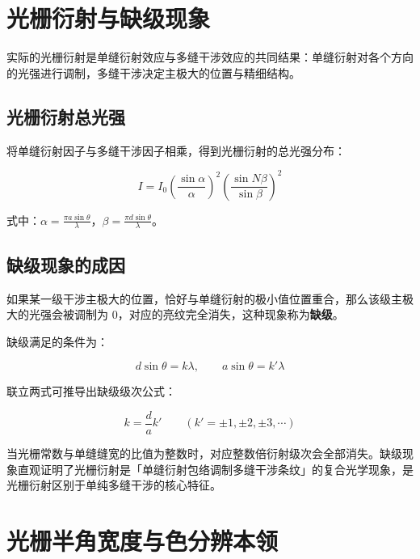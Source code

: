 \documentclass[12pt,a4paper]{ctexrep}
\begin{document}
\section{光栅衍射与缺级现象}

实际的光栅衍射是单缝衍射效应与多缝干涉效应的共同结果：单缝衍射对各个方向的光强进行调制，多缝干涉决定主极大的位置与精细结构。

\subsection{光栅衍射总光强}

将单缝衍射因子与多缝干涉因子相乘，得到光栅衍射的总光强分布：

\begin{equation*}
I={I}_{0}{\left( \frac{\sin{\alpha}}{\alpha} \right)}^{2}{\left( \frac{\sin N\beta}{\sin{\beta}} \right)}^{2}
\end{equation*}

式中：$\alpha=\frac{\pi a\sin\theta}{\lambda}$，$\beta=\frac{\pi d\sin\theta}{\lambda}$。

\subsection{缺级现象的成因}

如果某一级干涉主极大的位置，恰好与单缝衍射的极小值位置重合，那么该级主极大的光强会被调制为 0，对应的亮纹完全消失，这种现象称为\textbf{缺级}。

缺级满足的条件为：

\begin{equation*}
d\sin\theta=k\lambda,\qquad a\sin\theta=k'\lambda
\end{equation*}

联立两式可推导出缺级级次公式：

\begin{equation*}
k=\frac{d}{a}k'\qquad(k'=\pm1,\pm2,\pm3,\cdots)
\end{equation*}

当光栅常数与单缝缝宽的比值为整数时，对应整数倍衍射级次会全部消失。缺级现象直观证明了光栅衍射是「单缝衍射包络调制多缝干涉条纹」的复合光学现象，是光栅衍射区别于单纯多缝干涉的核心特征。

\section{光栅半角宽度与色分辨本领}
\end{document}
